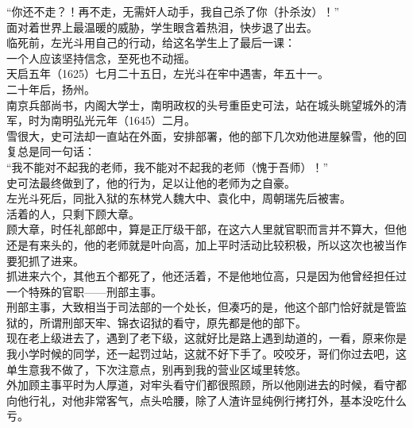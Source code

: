\begin{multicols}{\theparacolNo}
“你还不走？！再不走，无需奸人动手，我自己杀了你（扑杀汝）！”\\

面对着世界上最温暖的威胁，学生眼含着热泪，快步退了出去。\\

临死前，左光斗用自己的行动，给这名学生上了最后一课：\\

一个人应该坚持信念，至死也不动摇。\\

天启五年（1625）七月二十五日，左光斗在牢中遇害，年五十一。\\

二十年后，扬州。\\

南京兵部尚书，内阁大学士，南明政权的头号重臣史可法，站在城头眺望城外的清军，时为南明弘光元年（1645）二月。\\

雪很大，史可法却一直站在外面，安排部署，他的部下几次劝他进屋躲雪，他的回复总是同一句话：\\

“我不能对不起我的老师，我不能对不起我的老师（愧于吾师）！”\\

史可法最终做到了，他的行为，足以让他的老师为之自豪。\\

左光斗死后，同批入狱的东林党人魏大中、袁化中，周朝瑞先后被害。\\

活着的人，只剩下顾大章。\\

顾大章，时任礼部郎中，算是正厅级干部，在这六人里就官职而言并不算大，但他还是有来头的，他的老师就是叶向高，加上平时活动比较积极，所以这次也被当作要犯抓了进来。\\

抓进来六个，其他五个都死了，他还活着，不是他地位高，只是因为他曾经担任过一个特殊的官职——刑部主事。\\

刑部主事，大致相当于司法部的一个处长，但凑巧的是，他这个部门恰好就是管监狱的，所谓刑部天牢、锦衣诏狱的看守，原先都是他的部下。\\

现在老上级进去了，遇到了老下级，这就好比是路上遇到劫道的，一看，原来你是我小学时候的同学，还一起罚过站，这就不好下手了。咬咬牙，哥们你过去吧，这单生意我不做了，下次注意点，别再到我的营业区域里转悠。\\

外加顾主事平时为人厚道，对牢头看守们都很照顾，所以他刚进去的时候，看守都向他行礼，对他非常客气，点头哈腰，除了人渣许显纯例行拷打外，基本没吃什么亏。\\


\end{multicols}
